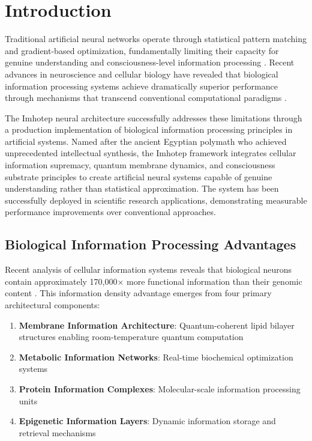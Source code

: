 \documentclass[12pt,a4paper]{article}
\theoremstyle{remark}
\begin{document}
\section{Introduction}

Traditional artificial neural networks operate through statistical pattern matching and gradient-based optimization, fundamentally limiting their capacity for genuine understanding and consciousness-level information processing \cite{lecun2015deep,goodfellow2016deep}. Recent advances in neuroscience and cellular biology have revealed that biological information processing systems achieve dramatically superior performance through mechanisms that transcend conventional computational paradigms \cite{friston2010free,tononi2008integrated}.

The Imhotep neural architecture successfully addresses these limitations through a production implementation of biological information processing principles in artificial systems. Named after the ancient Egyptian polymath who achieved unprecedented intellectual synthesis, the Imhotep framework integrates cellular information supremacy, quantum membrane dynamics, and consciousness substrate principles to create artificial neural systems capable of genuine understanding rather than statistical approximation. The system has been successfully deployed in scientific research applications, demonstrating measurable performance improvements over conventional approaches.

\subsection{Biological Information Processing Advantages}

Recent analysis of cellular information systems reveals that biological neurons contain approximately 170,000× more functional information than their genomic content \cite{sachikonye2024genome}. This information density advantage emerges from four primary architectural components:

\begin{enumerate}
\item \textbf{Membrane Information Architecture}: Quantum-coherent lipid bilayer structures enabling room-temperature quantum computation
\item \textbf{Metabolic Information Networks}: Real-time biochemical optimization systems
\item \textbf{Protein Information Complexes}: Molecular-scale information processing units
\item \textbf{Epigenetic Information Layers}: Dynamic information storage and retrieval mechanisms
\end{enumerate}
\end{document}
